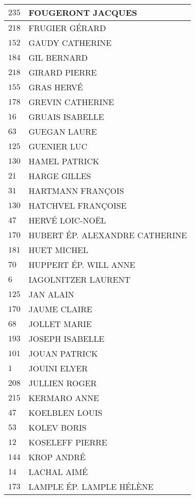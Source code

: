 \begin{xltabular}{\linewidth}{|l|X|}
    \hline
    $235$ & FOUGERONT JACQUES \\
    \hline
    $218$ & FRUGIER GÉRARD \\
    \hline
    $152$ & GAUDY CATHERINE \\
    \hline
    $184$ & GIL BERNARD \\
    \hline
    $218$ & GIRARD PIERRE \\
    \hline
    $155$ & GRAS HERVÉ \\
    \hline
    $178$ & GREVIN CATHERINE \\
    \hline
    $16$ & GRUAIS ISABELLE \\
    \hline
    $63$ & GUEGAN LAURE \\
    \hline
    $125$ & GUENIER LUC \\
    \hline
    $130$ & HAMEL PATRICK \\
    \hline
    $21$ & HARGE GILLES \\
    \hline
    $31$ & HARTMANN FRANÇOIS \\
    \hline
    $130$ & HATCHVEL FRANÇOISE \\
    \hline
    $47$ & HERVÉ LOIC-NOËL \\
    \hline
    $170$ & HUBERT ÉP. ALEXANDRE CATHERINE \\
    \hline
    $181$ & HUET MICHEL \\
    \hline
    $70$ & HUPPERT ÉP. WILL ANNE \\
    \hline
    $6$ & IAGOLNITZER LAURENT \\
    \hline
    $125$ & JAN ALAIN \\
    \hline
    $170$ & JAUME CLAIRE \\
    \hline
    $68$ & JOLLET MARIE \\
    \hline
    $193$ & JOSEPH ISABELLE \\
    \hline
    $101$ & JOUAN PATRICK \\
    \hline
    $1$ & JOUINI ELYER \\
    \hline
    $208$ & JULLIEN ROGER \\
    \hline
    $215$ & KERMARO ANNE \\
    \hline
    $47$ & KOELBLEN LOUIS \\
    \hline
    $53$ & KOLEV BORIS \\
    \hline
    $12$ & KOSELEFF PIERRE \\
    \hline
    $144$ & KROP ANDRÉ \\
    \hline
    $14$ & LACHAL AIMÉ \\
    \hline
    $173$ & LAMPLE ÉP. LAMPLE HÉLÈNE \\

\end{xltabular}
